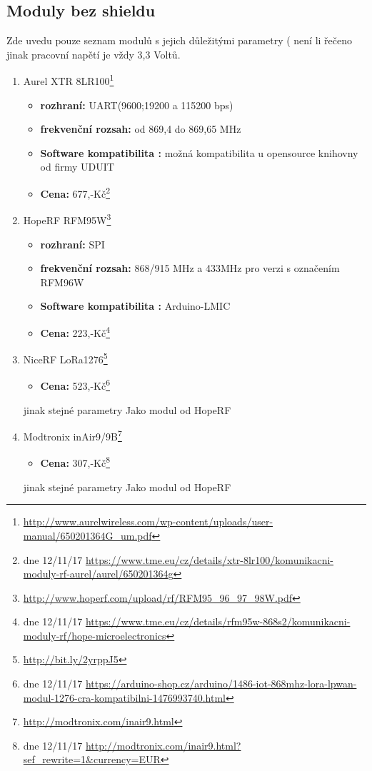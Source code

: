 \documentclass[paper=a4, fontsize=11pt]{scrartcl}
\numberwithin{equation}{section}
\numberwithin{figure}{section}
\numberwithin{table}{section}
\begin{document}
	\subsection{Moduly bez shieldu}
		Zde uvedu pouze seznam modulů s jejich důležitými parametry ( není 		li řečeno jinak pracovní napětí je vždy 3,3 Voltů.
		\begin{enumerate}
			\item Aurel XTR 8LR100\footnote{\url{http://www.aurelwireless.com/wp-content/uploads/user-manual/650201364G_um.pdf}}
				\begin{itemize}
					\item \textbf{rozhraní:} UART(9600;19200 a 115200 bps)
					\item  \textbf{frekvenční rozsah:} od 869,4 do 869,65 MHz 
					\item  \textbf{Software kompatibilita :} možná					kompatibilita u opensource knihovny od firmy UDUIT	
					\item \textbf{Cena:} 677,-Kč\footnote{dne 12/11/17				\url{https://www.tme.eu/cz/details/xtr-8lr100/komunikacni-moduly-rf-aurel/aurel/650201364g}} 
				\end{itemize}
			\item HopeRF RFM95W\footnote{\url{http://www.hoperf.com/upload/rf/RFM95_96_97_98W.pdf}}
				\begin{itemize}
					\item \textbf{rozhraní:} SPI
					\item  \textbf{frekvenční rozsah:} 868/915 MHz a 433MHz			pro verzi s označením RFM96W
					\item  \textbf{Software kompatibilita :} Arduino-LMIC
					\item \textbf{Cena:} 223,-Kč\footnote{dne 12/11/17				\url{https://www.tme.eu/cz/details/rfm95w-868s2/komunikacni-moduly-rf/hope-microelectronics}} 
				\end{itemize}
			\item NiceRF LoRa1276\footnote{\url{http://bit.ly/2yrppJ5}}
				\begin{itemize}
					\item \textbf{Cena:} 523,-Kč\footnote{dne 12/11/17				\url{https://arduino-shop.cz/arduino/1486-iot-868mhz-lora-lpwan-modul-1276-cra-kompatibilni-1476993740.html}}
				\end{itemize}
				jinak stejné parametry Jako modul od HopeRF
			\item Modtronix inAir9/9B\footnote{\url{http://modtronix.com/inair9.html}}
				\begin{itemize}
					\item \textbf{Cena:} 307,-Kč\footnote{dne 12/11/17		 \url{http://modtronix.com/inair9.html?sef_rewrite=1&currency=EUR}}
				\end{itemize}
				jinak stejné parametry Jako modul od HopeRF
		\end{enumerate}
\newpage
\end{document}
